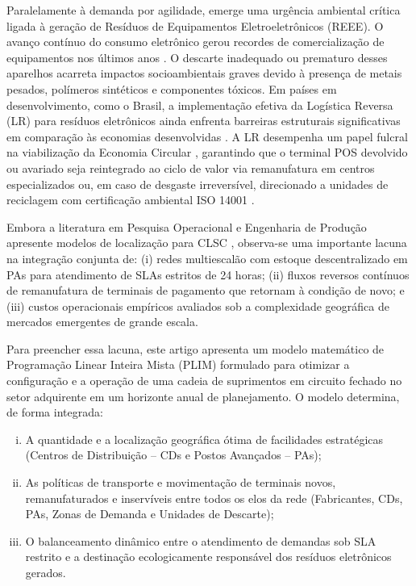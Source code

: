 \documentclass[preprint,12pt,authoryear]{elsarticle}
\begin{document}
Paralelamente à demanda por agilidade, emerge uma urgência ambiental crítica ligada à geração de Resíduos de Equipamentos Eletroeletrônicos (REEE). O avanço contínuo do consumo eletrônico gerou recordes de comercialização de equipamentos nos últimos anos \citep{Santos2014a}. O descarte inadequado ou prematuro desses aparelhos acarreta impactos socioambientais graves devido à presença de metais pesados, polímeros sintéticos e componentes tóxicos. Em países em desenvolvimento, como o Brasil, a implementação efetiva da Logística Reversa (LR) para resíduos eletrônicos ainda enfrenta barreiras estruturais significativas em comparação às economias desenvolvidas \citep{demajorovic2016logistica}. A LR desempenha um papel fulcral na viabilização da Economia Circular \citep{guarnieri2011logistica}, garantindo que o terminal POS devolvido ou avariado seja reintegrado ao ciclo de valor via remanufatura em centros especializados ou, em caso de desgaste irreversível, direcionado a unidades de reciclagem com certificação ambiental ISO 14001 \citep{mogalelogirever}.

Embora a literatura em Pesquisa Operacional e Engenharia de Produção apresente modelos de localização para CLSC \citep{SINGH2018343,AMIN2017316}, observa-se uma importante lacuna na integração conjunta de: (i) redes multiescalão com estoque descentralizado em PAs para atendimento de SLAs estritos de 24 horas; (ii) fluxos reversos contínuos de remanufatura de terminais de pagamento que retornam à condição de novo; e (iii) custos operacionais empíricos avaliados sob a complexidade geográfica de mercados emergentes de grande escala.

Para preencher essa lacuna, este artigo apresenta um modelo matemático de Programação Linear Inteira Mista (PLIM) formulado para otimizar a configuração e a operação de uma cadeia de suprimentos em circuito fechado no setor adquirente em um horizonte anual de planejamento. O modelo determina, de forma integrada:
\begin{enumerate}[(i)]
    \item A quantidade e a localização geográfica ótima de facilidades estratégicas (Centros de Distribuição -- CDs e Postos Avançados -- PAs);
    \item As políticas de transporte e movimentação de terminais novos, remanufaturados e inservíveis entre todos os elos da rede (Fabricantes, CDs, PAs, Zonas de Demanda e Unidades de Descarte);
    \item O balanceamento dinâmico entre o atendimento de demandas sob SLA restrito e a destinação ecologicamente responsável dos resíduos eletrônicos gerados.
\end{enumerate}
\end{document}
